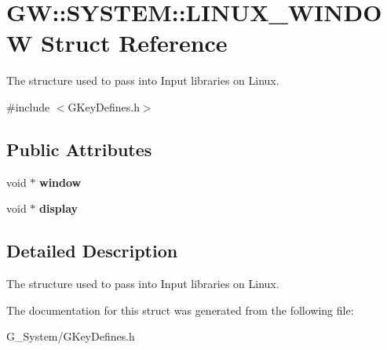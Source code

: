 \hypertarget{struct_g_w_1_1_s_y_s_t_e_m_1_1_l_i_n_u_x___w_i_n_d_o_w}{}\section{GW\+:\+:S\+Y\+S\+T\+EM\+:\+:L\+I\+N\+U\+X\+\_\+\+W\+I\+N\+D\+OW Struct Reference}
\label{struct_g_w_1_1_s_y_s_t_e_m_1_1_l_i_n_u_x___w_i_n_d_o_w}


The structure used to pass into Input libraries on Linux.  




{\ttfamily \#include $<$G\+Key\+Defines.\+h$>$}

\subsection*{Public Attributes}
\begin{DoxyCompactItemize}
\item 
\mbox{\label{struct_g_w_1_1_s_y_s_t_e_m_1_1_l_i_n_u_x___w_i_n_d_o_w_a9d4ffe1d048716af5f2d1fe3595b6b99}} 
void $\ast$ {\bfseries window}
\item 
\mbox{\label{struct_g_w_1_1_s_y_s_t_e_m_1_1_l_i_n_u_x___w_i_n_d_o_w_ae68b93065e8ebd9de010f42ccf688ac5}} 
void $\ast$ {\bfseries display}
\end{DoxyCompactItemize}


\subsection{Detailed Description}
The structure used to pass into Input libraries on Linux. 

The documentation for this struct was generated from the following file\+:\begin{DoxyCompactItemize}
\item 
G\+\_\+\+System/G\+Key\+Defines.\+h\end{DoxyCompactItemize}
